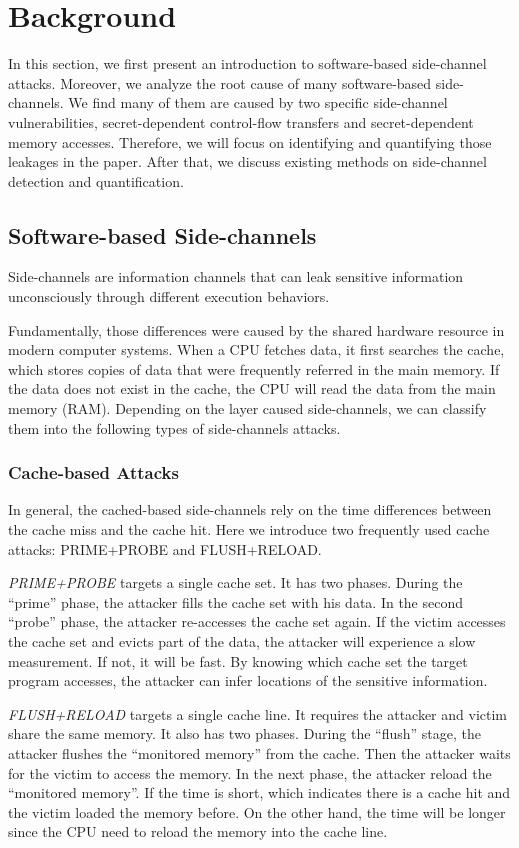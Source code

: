 \section{Background}
In this section, we first present an introduction to software-based 
side-channel attacks. Moreover, we analyze the root cause of many
software-based side-channels. We find many of them are caused by
two specific side-channel vulnerabilities, secret-dependent control-flow transfers and
secret-dependent memory accesses. Therefore, we will focus on identifying
and quantifying those leakages in the paper. After that, we 
discuss existing methods on side-channel detection and quantification.

\subsection{Software-based Side-channels}
Side-channels are information channels that can leak sensitive information 
unconsciously through different execution behaviors.  

Fundamentally, those differences were caused by the shared hardware
resource in modern computer systems. When a CPU fetches data, it first searches
the cache, which stores copies of data that were frequently referred in the main memory. 
If the data does not exist in the cache, the CPU will read the data from the main memory (RAM). 
Depending on the layer caused side-channels, we can classify them 
into the following types of side-channels attacks.

\subsubsection{Cache-based Attacks}
In general, the cached-based side-channels rely on the time differences 
between the cache miss
and the cache hit. Here we introduce two frequently used cache attacks:
PRIME+PROBE and FLUSH+RELOAD.

\textit{PRIME+PROBE} targets a single cache set. It has two phases. During the
``prime'' phase, the attacker fills the cache set with his data.
In the second ``probe'' phase, the attacker re-accesses the cache set
again. If the victim accesses the cache set and evicts part of 
the data, the attacker will experience a slow measurement. If not, 
it will be fast. By knowing which cache set the target
program accesses, the attacker can infer locations of
the sensitive information.

\textit{FLUSH+RELOAD} targets a single cache line. 
It requires the attacker and victim share the same memory.
It also has two phases. During the ``flush'' stage, the attacker 
flushes the ``monitored memory'' from the cache. Then the attacker
waits for the victim to access the memory. In the next phase, the 
attacker reload the ``monitored memory''. If the time is short, which
indicates there is a cache hit and the victim loaded the memory before. 
On the other hand, the time will be longer since the CPU need to reload
the memory into the cache line. 

